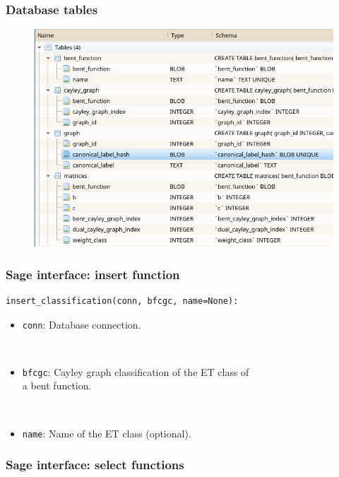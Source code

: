 \documentclass[pdf,sprung,slideColor,nocolorBG]{beamer}
\newenvironment{colortheme}[1]{
\def\ProvidesPackageRCS $##1${\relax}
\renewcommand{\ProcessOptions}{\relax}
\makeatletter

\makeatother
}{}
\begin{document}
\begin{colortheme}{jubata}

\begin{frame}
\frametitle{Database tables}
\begin{figure}
\centering
\begin{minipage}{\textwidth}
  \centering
\includegraphics[width=.75\linewidth]{Classification-schema-SQLite.png}
  \label{fig:Classification_schema_SQLite}
\end{minipage}%
\end{figure}
\end{frame}

\begin{frame}[fragile]
\frametitle{Sage interface: insert function}

\begin{verbatim}
insert_classification(conn, bfcgc, name=None):
\end{verbatim}

\begin{itemize}
 \item \texttt{conn}: Database connection.

~

 \item \texttt{bfcgc}: Cayley graph classification of the ET class of \\a bent function.

~

 \item \texttt{name}: Name of the ET class (optional).
\end{itemize}

\end{frame}

\begin{frame}[fragile]
\frametitle{Sage interface: select functions}


\end{frame}
\end{colortheme}
\end{document}
